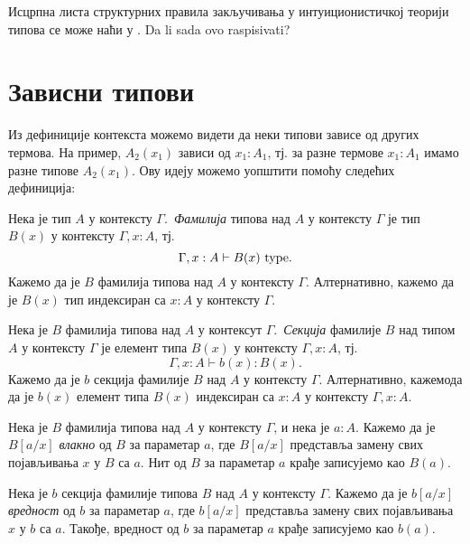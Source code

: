 \documentclass[12pt,oneside]{memoir}
\begin{document}
Исцрпна листа структурних правила закључивања у интуиционистичкој теорији типова се може наћи у \cite{rijke2022intro}. {\color{red}Da li sada ovo raspisivati?}

\section{Зависни типови}

Из дефиниције контекста можемо видети да неки типови зависе од других термова. На пример, $A_2(x_1)$ зависи од $x_1 : A_1$, тј. за разне термове $x_1 : A_1$ имамо разне типове $A_2(x_1)$. Ову идеју можемо уопштити помоћу следећих дефиниција:

\begin{definition}
    Нека је тип $A$ у контексту $\Gamma$.~\emph{Фамилија} типова над $A$ у контексту $\Gamma$ је тип $B(x)$ у контексту $\Gamma, x : A$, тј.
    \[\Gamma, x : A \vdash B(x)~{\mathrm{type}}.\]
    Кажемо да је $B$ фамилија типова над $A$ у контексту $\Gamma$. Алтернативно, кажемо да је $B(x)$ тип индексиран са $x : A$ у контексту $\Gamma$.
\end{definition}

\begin{definition}
    Нека је $B$ фамилија типова над $A$ у контексут $\Gamma$.~\emph{Секција} фамилије $B$ над типом $A$ у контексту $\Gamma$ је елемент типа $B(x)$ у контексту $\Gamma, x : A$, тј.
    \[\Gamma, x : A \vdash b(x) : B(x).\]
    Кажемо да је $b$ секција фамилије $B$ над $A$ у контексту $\Gamma$. Алтернативно, кажемода да је $b(x)$ елемент типа $B(x)$ индексиран са $x : A$ у контексту $\Gamma, x : A$. 
\end{definition}

\begin{definition}
    Нека је $B$ фамилија типова над $A$ у контексту $\Gamma$, и нека је $a : A$. Кажемо да је $B[a/x]$ \emph{влакно} од $B$ за параметар $a$, где $B[a/x]$ представља замену свих појављивања $x$ у $B$ са $a$. Нит од $B$ за параметар $a$ крађе записујемо као $B(a)$.
\end{definition}

\begin{definition}
    Нека је $b$ секција фамилије типова $B$ над $A$ у контексту $\Gamma$. Кажемо да је $b[a/x]$ \emph{вредност} од $b$ за параметар $a$, где $b[a/x]$ представља замену свих појављивања $x$ у $b$ са $a$. Такође, вредност од $b$ за параметар $a$ крађе записујемо као $b(a)$.
\end{definition}
\end{document}
